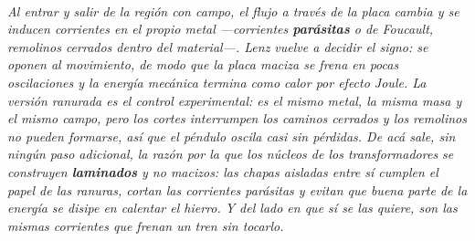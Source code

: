 \begin{center}
\begin{tikzpicture}[scale=1]
\end{tikzpicture}\\[0.5em]
{\small\itshape Al entrar y salir de la región con campo, el flujo a través de
la placa cambia y se inducen corrientes en el propio metal ---corrientes
\textbf{parásitas} o de Foucault, remolinos cerrados dentro del material---.
Lenz vuelve a decidir el signo: se oponen al movimiento, de modo que la placa
maciza se frena en pocas oscilaciones y la energía mecánica termina como calor
por efecto Joule. La versión ranurada es el control experimental: es el mismo
metal, la misma masa y el mismo campo, pero los cortes interrumpen los caminos
cerrados y los remolinos no pueden formarse, así que el péndulo oscila casi sin
pérdidas. De acá sale, sin ningún paso adicional, la razón por la que los
núcleos de los transformadores se construyen \textbf{laminados} y no macizos:
las chapas aisladas entre sí cumplen el papel de las ranuras, cortan las
corrientes parásitas y evitan que buena parte de la energía se disipe en
calentar el hierro. Y del lado en que sí se las quiere, son las mismas
corrientes que frenan un tren sin tocarlo.}
\end{center}
